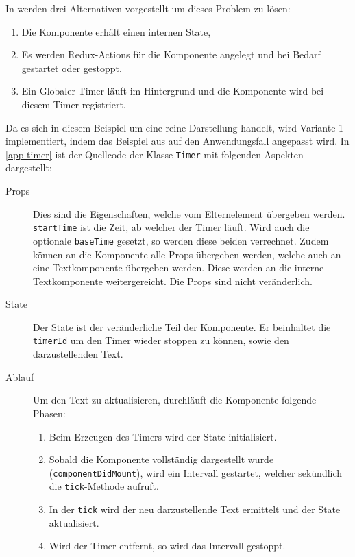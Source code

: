 In \cite{Timersin85:online} werden drei Alternativen vorgestellt um dieses Problem zu lösen:
\begin{enumerate}
    \item Die Komponente erhält einen internen State,
    \item Es werden Redux-Actions für die Komponente angelegt und bei Bedarf gestartet oder gestoppt.
    \item Ein Globaler Timer läuft im Hintergrund und die Komponente wird bei diesem Timer registriert.
\end{enumerate}

Da es sich in diesem Beispiel um eine reine Darstellung handelt,
wird Variante 1 implementiert, indem das Beispiel aus \cite{Timersin85:online} auf den Anwendungsfall angepasst wird.
In \autoref{app-timer} ist der Quellcode der Klasse \texttt{Timer} mit folgenden Aspekten dargestellt:
\begin{description}
    \item[Props] Dies sind die Eigenschaften, welche vom Elternelement übergeben werden.
    \texttt{startTime} ist die Zeit, ab welcher der Timer läuft.
    Wird auch die optionale \texttt{baseTime} gesetzt, so werden diese beiden verrechnet.
    Zudem können an die Komponente alle Props übergeben werden, welche auch an eine Textkomponente übergeben werden.
    Diese werden an die interne Textkomponente weitergereicht.
    Die Props sind nicht veränderlich.
    \item[State] Der State ist der veränderliche Teil der Komponente.
    Er beinhaltet die \texttt{timerId} um den Timer wieder stoppen zu können,
    sowie den darzustellenden Text.
    \item[Ablauf]
    Um den Text zu aktualisieren, durchläuft die Komponente folgende Phasen:
    \begin{enumerate}
        \item Beim Erzeugen des Timers wird der State initialisiert.
        \item Sobald die Komponente vollständig dargestellt wurde (\texttt{componentDidMount}),
        wird ein Intervall gestartet, welcher sekündlich die \texttt{tick}-Methode aufruft.
        \item In der \texttt{tick} wird der neu darzustellende Text ermittelt und der State aktualisiert.
        \item Wird der Timer entfernt, so wird das Intervall gestoppt.
    \end{enumerate}
\end{description}

